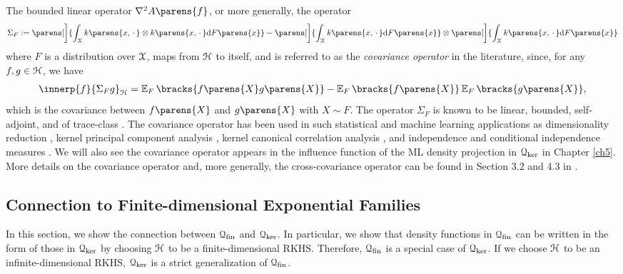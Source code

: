 The bounded linear operator $\nabla^2 A \parens{f}$, or more generally, the operator 
\begin{align*}
	\Sigma_F := \parens[\bigg]{\int_{\calX} k \parens{x, \,\cdot\,} \otimes k \parens{x, \,\cdot\,} \diff F \parens{x} } - \parens[\bigg]{\int_{\calX} k \parens{x, \,\cdot\,} \diff F \parens{x} } \otimes \parens[\bigg]{\int_{\calX} k \parens{x, \,\cdot\,} \diff F \parens{x} }
\end{align*}
where $F$ is a distribution over $\mathcal{X}$, maps from $\mathcal{H}$ to itself, and is referred to as the \textit{covariance operator} in the literature, since, for any $f, g \in \mathcal{H}$, we have 
\begin{align*}
	\innerp{f}{\Sigma_F g}_{\calH} = \E_F \bracks{f \parens{X} g \parens{X}} - \E_F \bracks{f \parens{X}} \E_F \bracks{g \parens{X}}, 
\end{align*}
which is the covariance between $f \parens{X}$ and $g \parens{X}$ with $X \sim F$. The operator $\Sigma_F$ is known to be linear, bounded, self-adjoint, and of trace-class \parencites{Baker1971-pu}. The covariance operator has been used in such statistical and machine learning applications as dimensionality reduction \parencites{Fukumizu2004-zw, Fukumizu2009-zh}, kernel principal component analysis \parencites{Scholkopf1998-jn}, kernel canonical correlation analysis \parencites{Fukumizu2007-rd}, and independence and conditional independence measures \parencites{Gretton2005-tj, Fukumizu2007-rc}. We will also see the covariance operator appears in the influence function of the ML density projection in $\mathcal{Q}_{\ker}$ in Chapter \ref{ch5}. More details on the covariance operator and, more generally, the cross-covariance operator can be found in Section 3.2 and 4.3 in \textcites{kernel-mean-embedding-survey-muandet}. 


\subsection{Connection to Finite-dimensional Exponential Families}\label{subsection-connection-fin-exp-fam}

In this section, we show the connection between $\mathcal{Q}_{\mathrm{fin}}$ and $\mathcal{Q}_{\ker}$. In particular, we show that density functions in $\mathcal{Q}_{\mathrm{fin}}$ can be written in the form of those in $\mathcal{Q}_{\ker}$ by choosing $\mathcal{H}$ to be a finite-dimensional RKHS. Therefore, $\mathcal{Q}_{\mathrm{fin}}$ is a special case of $\mathcal{Q}_{\ker}$. If we choose $\mathcal{H}$ to be an infinite-dimensional RKHS, $\mathcal{Q}_{\ker}$ is a strict generalization of $\mathcal{Q}_{\mathrm{fin}}$. 

